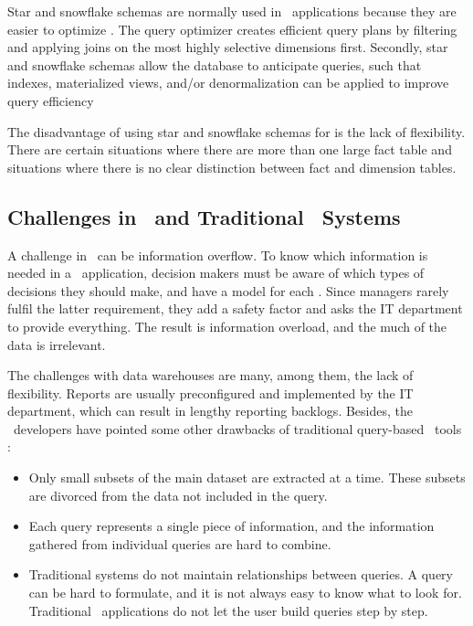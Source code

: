 Star and snowflake schemas are normally used in \bi~applications because they are easier to optimize \cite{Lamb2012-kg}. The query optimizer creates efficient query plans by filtering and applying joins on the most highly selective dimensions first. Secondly, star and snowflake schemas allow the database to anticipate queries, such that indexes, materialized views, and/or denormalization can be applied to improve query efficiency \cite{Barber2012-xt}

The disadvantage of using star and snowflake schemas for \bi is the lack of flexibility. There are certain situations where there are more than one large fact table and situations where there is no clear distinction between fact and dimension tables.

\subsection{Challenges in \bi~and Traditional \bi~Systems} 
\label{sub:Challenges in Business Intelligence and Traditional Business Intelligence Systems}
A challenge in \bi~can be information overflow. To know which information is needed in a \bi~application, decision makers must be aware of which types of decisions they should make, and have a model for each \cite{Ackoff1999-wk}. Since managers rarely fulfil the latter requirement, they add a safety factor and asks the IT department to provide everything. The result is information overload, and the much of the data is irrelevant. 

The challenges with data warehouses are many, among them, the lack of flexibility. Reports are usually preconfigured and implemented by the IT department, which can result in lengthy reporting backlogs. Besides, the \qlikview~developers have pointed some other drawbacks of traditional query-based \bi~tools \cite{Qlik2010-ya}:
\begin{itemize}
  \item Only small subsets of the main dataset are extracted at a time. These subsets are divorced from the data not included in the query.
  \item Each query represents a single piece of information, and the information gathered from individual queries are hard to combine.
  \item Traditional systems do not maintain relationships between queries. A query can be hard to formulate, and it is not always easy to know what to look for. Traditional \bi~applications do not let the user build queries step by step.
\end{itemize}


